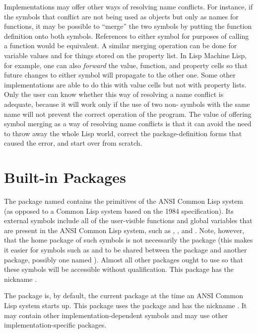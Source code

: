 Implementations may offer other ways of resolving name conflicts.
For instance, if the symbols that conflict are not being used as
objects but only as names for functions, it may be possible to ``merge''
the two symbols by putting the function definition onto both symbols.
References to either symbol for purposes of calling a function would be
equivalent.  A similar merging operation can be done for variable values
and for things stored on the property list.  In Lisp Machine Lisp, for example, one can
also \emph{forward} the value, function, and property cells so that future
changes to either symbol will propagate to the other one.  Some other
implementations are able to do this with value cells but not with
property lists.  Only the user can know whether this way of resolving
a name conflict is adequate, because it will work only if
the use of two non-
symbols with the same name will not prevent the correct operation of
the program.  The value of offering symbol merging as a way of resolving
name conflicts is that it can avoid the need to throw away the whole
Lisp world, correct the package-definition forms
that caused the error, and start over from scratch.

\section{Built-in Packages}

\begin{flushdesc}
\item[\cdf{common-lisp}]
The package named  contains the primitives of the
ANSI Common Lisp system (as opposed to a Common Lisp system based
on the 1984 specification).  Its external symbols include all of the
user-visible functions and global variables that are present in the
ANSI Common Lisp system, such as , , and .
Note, however, that the home package of such symbols is not
necessarily the  package (this makes it easier for
symbols such as  and  to be shared between
the  package and another package, possibly one named ).
Almost all other packages ought to use  so that these
symbols will be accessible without qualification.
This package has the nickname .

\item[\cdf{common-lisp-user}]
The  package is, by default,
the current package at the time an ANSI Common Lisp system starts up.
This package uses the  package
and has the nickname .
It may contain other implementation-dependent symbols
and may use other implementation-specific packages.
\end{flushdesc}

